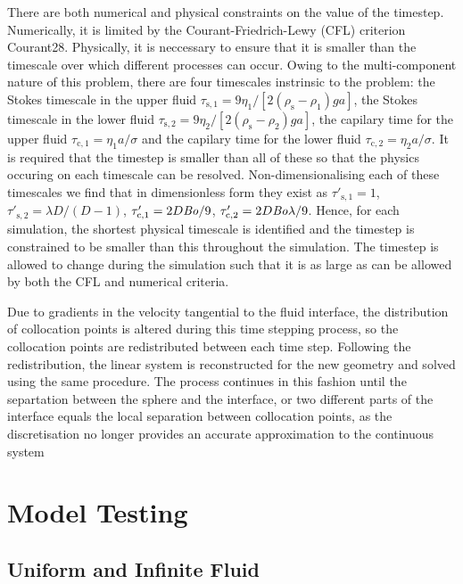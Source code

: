 \documentclass[12pt]{article}
\newcommand\Bo{\mbox{\textit{Bo}}}  %
\begin{document}
There are both numerical and physical constraints on the value of the timestep. Numerically, it is limited by the Courant-Friedrich-Lewy (CFL) criterion {Courant28}. Physically, it is neccessary to ensure that it is smaller than the timescale over which different processes can occur. Owing to the multi-component nature of this problem, there are four timescales instrinsic to the problem: the Stokes timescale in the upper fluid $\tau_{\text{s},1} = 9 \eta_{1} / [2 (\rho_{\text{s}} - \rho_{1}) g a]$, the Stokes timescale in the lower fluid $\tau_{\text{s},2} = 9 \eta_{2} / [2 (\rho_{\text{s}} - \rho_{2}) g a]$, the capilary time for the upper fluid $\tau_{\text{c},1} = \eta_{1} a / \sigma$ and the capilary time for the lower fluid $\tau_{\text{c},2} = \eta_{2} a / \sigma$. It is required that the timestep is smaller than all of these so that the physics occuring on each timescale can be resolved. Non-dimensionalising each of these timescales we find that in dimensionless form they exist as $\tau'_{\text{s},1} = 1$, $\tau'_{\text{s},2} = \lambda D / (D - 1)$, $\tau'_{\text{c},1} = 2 D \Bo / 9$, $\tau'_{\text{c},2} = 2 D \Bo \lambda / 9$. Hence, for each simulation, the shortest physical timescale is identified and the timestep is constrained to be smaller than this throughout the simulation. The timestep is allowed to change during the simulation such that it is as large as can be allowed by both the CFL and numerical criteria.


Due to gradients in the velocity tangential to the fluid interface, the distribution of collocation points is altered during this time stepping process, so the collocation points are redistributed between each time step. Following the redistribution, the linear system is reconstructed for the new geometry and solved using the same procedure. The process continues in this fashion until the separtation between the sphere and the interface, or two different parts of the interface equals the local separation between collocation points, as the discretisation no longer provides an accurate approximation to the continuous system


\section{Model Testing}
\label{sec:test}

\subsection{Uniform and Infinite Fluid}
\label{subsec:no_interf}
\end{document}

